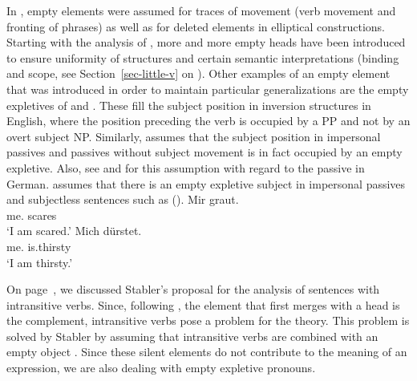 In \gbt, empty elements were assumed for traces of movement (verb movement and fronting of phrases) as well as for deleted elements in 
elliptical constructions. Starting with the analysis of \citet{Larson88a}, more and more empty heads have been introduced to ensure uniformity of structures and 
certain semantic interpretations (binding
and scope, see Section~\ref{sec-little-v} on \littlev). Other examples of an empty element that was introduced in order to maintain particular generalizations are the empty expletives
of \citet[]{Coopmans-89a-u} and \citet[Chapter~1]{Postal2004a-u}. These fill the subject
position in inversion structures in English, where the position preceding
the verb is occupied by a PP and not by an overt subject NP. Similarly, \citet[]{Grewendorf93} assumes that the subject position in impersonal
passives and passives without subject movement is in fact occupied by an
empty expletive. Also, see
 and \citet[]{Lohnstein2014a} for this assumption with regard to the passive
in German. \citet[Section~II.3.3.3]{Sternefeld2006a-u} assumes that there is an empty expletive subject in impersonal passives and subjectless sentences such as
().
\eal
\ex 
\gll Mir graut.\\
	 me.\dat{} scares\\
\glt `I am scared.'
\ex 
\gll Mich dürstet.\\
	 me.\acc{} is.thirsty\\
\glt `I am thirsty.'
\zl

\noindent
On page~\pageref{Beispiel-leeres-Element-intransitive-Verben}, we discussed Stabler's proposal for the analysis of sentences with intransitive
verbs. Since, following  \citet[]{Chomsky2008a}, the element that first merges with a head is the complement, intransitive verbs pose a problem for the
theory. This problem is solved by Stabler by assuming that intransitive verbs are combined with an empty object \citep[,
124]{Veenstra98a}. Since these silent elements do not contribute to the meaning of an expression, we are also dealing with empty expletive pronouns.

